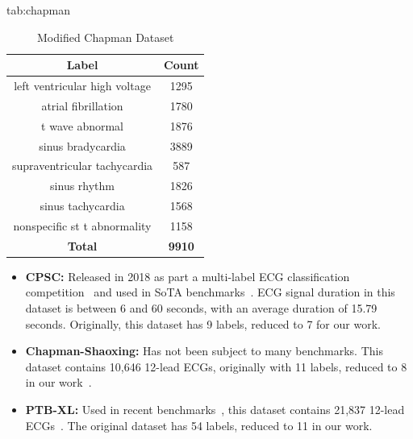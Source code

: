 \documentclass[pmlr,twocolumn]{jmlr}%
\begin{document}
\begin{table}[tbp]
\floatconts
  {tab:chapman}%
  {\caption{Modified Chapman Dataset}}%
  {
    \begin{tabular}{|c|c|}
     \hline
    Label & Count \\
     \hline
    left ventricular high voltage &  1295 \\
    atrial fibrillation           &  1780 \\
    t wave abnormal               &  1876 \\
    sinus bradycardia             &  3889 \\
    supraventricular tachycardia  &   587 \\
    sinus rhythm                  &  1826 \\
    sinus tachycardia             &  1568 \\
    nonspecific st t abnormality  &  1158 \\
     \hline
    \textbf{Total} & \textbf{9910}\\
    \hline
    \end{tabular}
  }
\end{table}

\begin{itemize}
    \item \textbf{CPSC:} Released in 2018 as part a multi-label ECG classification competition~\citep{liu2018open} and used in SoTA benchmarks~\citep{strodthoff2020deep}. ECG signal duration in this dataset is between 6 and 60 seconds, with an average duration of 15.79 seconds. Originally, this dataset has 9 labels, reduced to 7 for our work.
    \item \textbf{Chapman-Shaoxing:} Has not been subject to many benchmarks. This dataset contains 10,646 12-lead ECGs, originally with 11 labels, reduced to 8 in our work~\citep{zheng202012}.
    \item \textbf{PTB-XL:} Used in recent benchmarks~\citep{strodthoff2020deep}, this dataset contains 21,837 12-lead ECGs~\citep{wagner2020ptb}. The original dataset has 54 labels, reduced to 11 in our work. 
\end{itemize}
\end{document}
